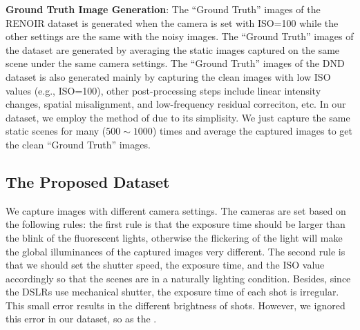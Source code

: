 \textbf{Ground Truth Image Generation}: The ``Ground Truth'' images of the RENOIR dataset \cite{RENOIR2014} is generated when the camera is set with ISO=100 while the other settings are the same with the noisy images. The ``Ground Truth'' images of the dataset \cite{crosschannel2016} are generated by averaging the static images captured on the same scene under the same camera settings. The ``Ground Truth'' images of the DND dataset \cite{dnd2017} is also generated mainly by capturing the clean images with low ISO values (e.g., ISO=100), other post-processing steps include   linear intensity changes, spatial misalignment, and low-frequency residual correciton, etc. In our dataset, we employ the method of \cite{crosschannel2016} due to its simplisity. We just capture the same static scenes for many ($500\sim1000$) times and average the captured images to get the clean ``Ground Truth'' images.
 
\subsection{The Proposed Dataset}

We capture images with different camera settings. The cameras are set based on the following rules: the first rule is that the exposure time should be larger than the blink of the fluorescent lights, otherwise the flickering of the light will make the global illuminances of the captured images very different. The second rule is that we should set the shutter speed, the exposure time, and the ISO value accordingly so that the scenes are in a naturally lighting condition. Besides, since the DSLRs use mechanical shutter, the exposure time of each shot is irregular. This small error results in the different brightness of shots. However, we ignored this error in our dataset, so as the \cite{crosschannel2016}.

